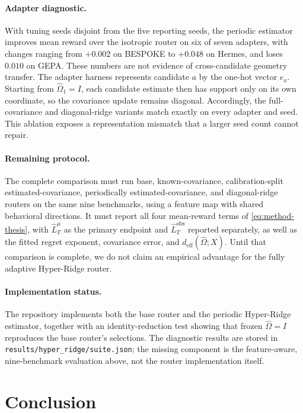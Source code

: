 \documentclass{article} %
\begin{document}
\paragraph{Adapter diagnostic.}
With tuning seeds disjoint from the five reporting seeds, the periodic estimator improves mean reward over the isotropic router on six of seven adapters, with changes ranging from $+0.002$ on BESPOKE to $+0.048$ on Hermes, and loses $0.010$ on GEPA. These numbers are not evidence of cross-candidate geometry transfer. The adapter harness represents candidate $a$ by the one-hot vector $e_a$. Starting from $\widehat{\Omega}_1=I$, each candidate estimate then has support only on its own coordinate, so the covariance update remains diagonal. Accordingly, the full-covariance and diagonal-ridge variants match exactly on every adapter and seed. This ablation exposes a representation mismatch that a larger seed count cannot repair.

\paragraph{Remaining protocol.}
The complete comparison must run base, known-covariance, calibration-split
estimated-covariance, periodically estimated-covariance, and diagonal-ridge
routers on the same nine benchmarks, using a feature map with shared behavioral
directions. It must report all four mean-reward terms of
\eqref{eq:method-thesis}, with \(\widehat L_T^\mu\) as the primary endpoint
and \(\widehat L_T^{\mathrm{obs}}\) reported separately, as well as the fitted
regret exponent, covariance error, and
\(d_{\mathrm{eff}}(\widehat\Omega;X)\). Until that comparison is complete, we
do not claim an empirical advantage for the fully adaptive Hyper-Ridge router.

\paragraph{Implementation status.}
The repository implements both the base router and the periodic Hyper-Ridge estimator, together with an identity-reduction test showing that frozen $\widehat{\Omega}=I$ reproduces the base router's selections. The diagnostic results are stored in \texttt{results/hyper\_ridge/suite.json}; the missing component is the feature-aware, nine-benchmark evaluation above, not the router implementation itself.

\section{Conclusion}
\end{document}

